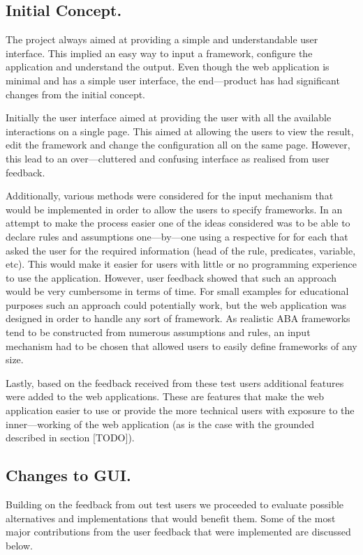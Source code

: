\subsection{Initial Concept.}
The project always aimed at providing a simple and understandable user interface. This implied an easy way to input a framework, configure the application and understand the output. Even though the web application is minimal and has a simple user interface, the end---product has had significant changes from the initial concept.

Initially the user interface aimed at providing the user with all the available interactions on a single page. This aimed at allowing the users to view the result, edit the framework and change the configuration all on the same page. However, this lead to an over---cluttered and confusing interface as realised from user feedback.

Additionally, various methods were considered for the input mechanism that would be implemented in order to allow the users to specify frameworks. In an attempt to make the process easier one of the ideas considered was to be able to declare rules and assumptions one---by---one using a respective for for each that asked the user for the required information (head of the rule, predicates, variable, etc). This would make it easier for users with little or no programming experience to use the application. However, user feedback showed that such an approach would be very cumbersome in terms of time. For small examples for educational purposes such an approach could potentially work, but the web application was designed in order to handle any sort of framework. As realistic ABA frameworks tend to be constructed from numerous assumptions and rules, an input mechanism had to be chosen that allowed users to easily define frameworks of any size.

Lastly, based on the feedback received from these test users additional features were added to the web applications. These are features that make the web application easier to use or provide the more technical users with exposure to the inner---working of the web application (as is the case with the grounded described in section [TODO]).

\subsection{Changes to GUI.}
Building on the feedback from out test users we proceeded to evaluate possible alternatives and implementations that would benefit them. Some of the most major contributions from the user feedback that were implemented are discussed below.

